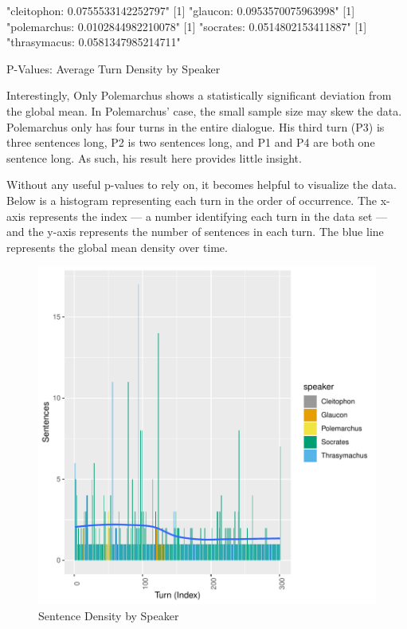 \documentclass[noraggedright]{turabian-researchpaper}
\begin{document}
\begin{table}
\begin{Schunk}
\begin{Soutput}
[1] "cleitophon: 0.0755533142252797"
[1] "glaucon: 0.0953570075963998"
[1] "polemarchus: 0.0102844982210078"
[1] "socrates: 0.0514802153411887"
[1] "thrasymacus: 0.0581347985214711"
\end{Soutput}
\end{Schunk}
\caption{P-Values: Average Turn Density by Speaker}
\label{tab:DensityPval}
\end{table}

Interestingly, Only Polemarchus shows a statistically significant deviation from
the global mean. In Polemarchus' case, the small sample size may skew the data.
Polemarchus only has four turns in the entire dialogue. His third turn (P3) is
three sentences long, P2 is two sentences long, and P1 and P4 are both one
sentence long. As such, his result here provides little insight. 

Without any useful p-values to rely on, it becomes helpful to visualize the
data. Below is a histogram representing each turn in the order of occurrence.
The x-axis represents the index — a number identifying each turn in the data
set — and the y-axis represents the number of sentences in each turn. The blue
line represents the global mean density over time.

\begin{figure}
\includegraphics{GreatFlood-Turn_Conseq}
\caption{Sentence Density by Speaker}
\label{graph:SentenceDensity}
\end{figure}
\end{document}
